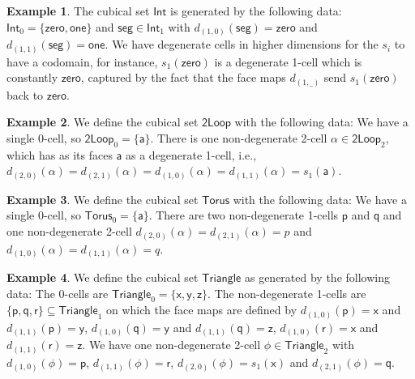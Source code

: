 \documentclass[11pt]{article}
\theoremstyle{definition}
\newtheorem{example}{Example}
\newcommand{\smap}[1]{s_{{#1}}}
\newcommand{\dmap}[2]{d_{({#1} , {#2})}}
\newcommand{\cset}[1]{\mathsf{{#1}}}
\begin{document}
\begin{example}\label{exp:int}
  The cubical set $\cset{Int}$ is generated by the following data: $\cset{Int}_0
  = \{ \cset{zero} , \cset{one} \}$ and $\cset{seg} \in \cset{Int}_1$ with
  $\dmap{1}{0}(\cset{seg}) = \cset{zero}$ and $\dmap{1}{1}(\cset{seg}) =
  \cset{one}$. We have degenerate cells in higher dimensions for the $\smap{i}$
  to have a codomain, for instance, $\smap{1}(\cset{zero})$ is a degenerate
  1-cell which is constantly $\cset{zero}$, captured by the fact that the face
  maps $\dmap{1}{\_}$ send
  $\smap{1}(\cset{zero})$ back to $\cset{zero}$.
\end{example}

\begin{example}\label{exp:loopspace}
  We define the cubical set $\cset{2Loop}$ with the following data: We have a
  single 0-cell, so $\cset{2Loop}_0 = \{
  \cset{a} \}$. There is one non-degenerate 2-cell $\cset{\alpha} \in
  \cset{2Loop}_2$, which has as its faces $\cset{a}$ as a degenerate 1-cell, i.e.,
  $\dmap{2}{0}(\cset{\alpha}) = \dmap{2}{1}(\cset{\alpha}) =
  \dmap{1}{0}(\cset{\alpha}) = \dmap{1}{1}(\cset{\alpha}) = \smap{1} (\cset{a})$.
\end{example}

\begin{example}\label{exp:torus}
  We define the cubical set $\cset{Torus}$ with the following data: We have a
  single 0-cell, so $\cset{Torus}_0 = \{ \cset{a} \}$. There are two
  non-degenerate 1-cells $\cset{p}$ and $\cset{q}$ and one non-degenerate 2-cell
  $\dmap{2}{0}(\cset{\alpha}) = \dmap{2}{1}(\cset{\alpha}) = p$ and
  $\dmap{1}{0}(\cset{\alpha}) = \dmap{1}{1}(\cset{\alpha}) = q$.
\end{example}

\begin{example}\label{exp:triangle}
  We define the cubical set $\cset{Triangle}$ as generated by the following
  data: The 0-cells are $\cset{Triangle}_0 = \{ \cset{x} , \cset{y} , \cset{z}
  \}$. The non-degenerate 1-cells are $\{ \cset{p} ,
  \cset{q} , \cset{r} \} \subseteq \cset{Triangle}_1$ on which the face maps are defined by
    $\dmap{1}{0}(\cset{p}) = \cset{x}$ and $\dmap{1}{1}(\cset{p}) = \cset{y}$,
    $\dmap{1}{0}(\cset{q}) = \cset{y}$ and $\dmap{1}{1}(\cset{q}) = \cset{z}$,
    $\dmap{1}{0}(\cset{r}) = \cset{x}$ and $\dmap{1}{1}(\cset{r}) = \cset{z}$.
    We have one non-degenerate 2-cell $\cset{\phi} \in \cset{Triangle}_2$ with $\dmap{1}{0}(\cset{\phi}) =
    \cset{p}$, $\dmap{1}{1}(\cset{\phi}) = \cset{r}$, $\dmap{2}{0}(\cset{\phi})
    = \smap{1}(\cset{x})$ and $\dmap{2}{1}(\cset{\phi}) = \cset{q}$.
\end{example}
\end{document}
